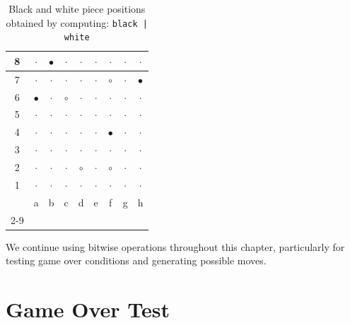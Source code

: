 \documentclass[12pt,a4paper,twoside,openright]{book}
\begin{document}
\begin{table}[H]
\centering
\caption{Black and white piece positions obtained by computing: \texttt{black | white}}
\label{tab:black_white_positions_game_example_move21}
\begin{tabular}{|c|c|c|c|c|c|c|c|c|}
\hline
8 & $\cdot$ & $\bullet$ & $\cdot$ & $\cdot$ & $\cdot$ & $\cdot$ & $\cdot$ & $\cdot$ \\ \hline
7 & $\cdot$ & $\cdot$ & $\cdot$ & $\cdot$ & $\cdot$ & $\circ$ & $\cdot$ & $\bullet$ \\ \hline
6 & $\bullet$ & $\cdot$ & $\circ$ & $\cdot$ & $\cdot$ & $\cdot$ & $\cdot$ & $\cdot$ \\ \hline
5 & $\cdot$ & $\cdot$ & $\cdot$ & $\cdot$ & $\cdot$ & $\cdot$ & $\cdot$ & $\cdot$ \\ \hline
4 & $\cdot$ & $\cdot$ & $\cdot$ & $\cdot$ & $\cdot$ & $\bullet$ & $\cdot$ & $\cdot$ \\ \hline
3 & $\cdot$ & $\cdot$ & $\cdot$ & $\cdot$ & $\cdot$ & $\cdot$ & $\cdot$ & $\cdot$ \\ \hline
2 & $\cdot$ & $\cdot$ & $\cdot$ & $\circ$ & $\cdot$ & $\circ$ & $\cdot$ & $\cdot$ \\ \hline
1 & $\cdot$ & $\cdot$ & $\cdot$ & $\cdot$ & $\cdot$ & $\cdot$ & $\cdot$ & $\cdot$ \\ \hline
\multicolumn{1}{c|}{} & a & b & c & d & e & f & g & h \\
\cline{2-9}
\end{tabular}
\end{table}

We continue using bitwise operations throughout this chapter, particularly for testing game over conditions and generating possible moves.

\section{Game Over Test}
\end{document}
